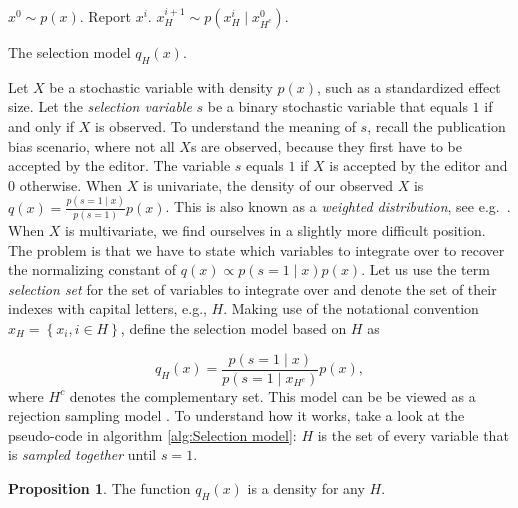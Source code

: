 \documentclass[preprint, authoryear]{elsarticle}
\theoremstyle{plain}
\theoremstyle{definition}
\newtheorem{prop}[theorem]{Proposition}
\begin{document}
\begin{algorithm}[!h]
\begin{algorithmic}[1]
	\State $x^{0}\sim p\left(x\right)$.
			\State Report $x^i$.           
		\Else         
			\State $x_{H}^{i+1}\sim p\left(x_{H}^{i}\mid x_{H^{c}}^{0}\right)$.        
		\EndIf  
	\EndFor  
\end{algorithmic}
\caption{\label{alg:Selection model}The selection model $q_{H}\left(x\right)$.}
\end{algorithm}

Let $X$ be a stochastic variable with density $p(x)$, such as a standardized effect size. Let the \emph{selection variable} $s$ be a binary stochastic variable that equals $1$ if and only if $X$ is observed. To understand the meaning of $s$, recall the publication bias scenario, where not all $X$s are observed, because they first have to be accepted by the editor. The variable $s$ equals $1$ if $X$ is accepted by the editor and $0$ otherwise. When $X$ is univariate, the density of our observed $X$ is $q\left(x\right)=\frac{p\left(s=1\mid x\right)}{p\left(s=1\right)}p\left(x\right)$. This is also known as a \emph{weighted distribution}, see e.g.\ \citet[][Eq. (3.1)]{rao1985weighted}. When $X$ is multivariate, we find ourselves in a slightly more difficult position. The problem is that we have to state which variables to integrate over to recover the normalizing constant of $q\left(x\right)\propto p\left(s=1\mid x\right)p\left(x\right)$. Let us use the term \emph{selection set} for the set of variables to integrate over and denote the set of their indexes with capital letters, e.g., $H$. Making use of the notational convention $x_{H}=\left\{ x_{i},i\in H\right\}$, define the selection model based on $H$ as

\begin{equation}
q_{H}\left(x\right)=\frac{p\left(s=1\mid x\right)}{p\left(s=1\mid x_{H^{c}}\right)}p\left(x\right)\label{eq:H-selection model},
\end{equation}
where $H^c$ denotes the complementary set. This model can be be viewed as a rejection sampling model \citep{von1951various}. To understand how it works, take a look at the pseudo-code in algorithm \ref{alg:Selection model}: $H$ is the set of every variable that is \emph{sampled together} until $s=1$.

\begin{prop}
The function $q_{H}\left(x\right)$ is a density for any $H$.
\end{prop}
\end{document}
